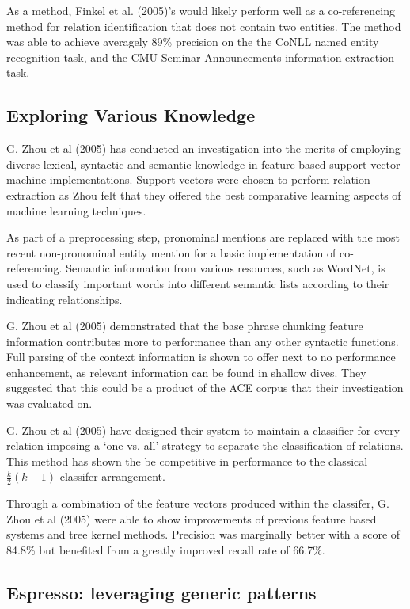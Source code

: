 \documentclass{ecmm427_assignment}
\begin{document}
As a method, Finkel et al. (2005)'s would likely perform well as a co-referencing method for relation identification that does not contain two entities. The method was able to achieve averagely 89\% precision on the the CoNLL named entity recognition task, and the CMU Seminar Announcements information extraction task.

\subsection{Exploring Various Knowledge}


G. Zhou et al (2005)  has conducted an investigation into the merits of employing diverse lexical, syntactic and semantic knowledge in feature-based support vector machine implementations. Support vectors were chosen to perform relation extraction as Zhou felt that they offered the best comparative learning aspects of machine learning techniques. 

As part of a preprocessing step, pronominal mentions are replaced with the most recent non-pronominal entity mention for a basic implementation of co-referencing. Semantic information from various resources, such as WordNet, is used to classify important words into different semantic lists according to their indicating relationships.

G. Zhou et al (2005) demonstrated that the base phrase chunking feature information contributes more to performance than any other syntactic functions. Full parsing of the context information is shown to offer next to no performance enhancement, as relevant information can be found in shallow dives. They suggested that this could be a product of the ACE corpus that their investigation was evaluated on.

G. Zhou et al (2005) have designed their system to maintain a classifier for every relation imposing a `one vs. all' strategy to separate the classification of relations. This method has shown the be competitive in performance to the classical $\frac{k}{2}(k-1)$ classifer arrangement.

Through a combination of the feature vectors produced within the classifer, G. Zhou et al (2005) were able to show improvements of previous feature based systems and tree kernel methods. Precision was marginally better with a score of 84.8\% but benefited from a greatly improved recall rate of 66.7\%.

\subsection{Espresso: leveraging generic patterns}
\end{document}

